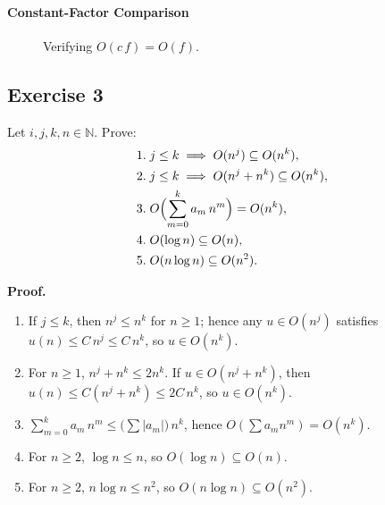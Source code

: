 \documentclass[12pt]{article}
\begin{document}
\paragraph{Constant-Factor Comparison}
\begin{figure}[h]
  \centering
  \caption{Verifying \(O(c\,f)=O(f)\).}
\end{figure}

\subsection{Exercise 3}
Let \(i,j,k,n\in\mathbb N\).  Prove:
\[
\begin{aligned}
1.\;&j\le k\implies O(n^j)\subseteq O(n^k),\\
2.\;&j\le k\implies O(n^j+n^k)\subseteq O(n^k),\\
3.\;&O\Bigl(\sum_{m=0}^k a_m\,n^m\Bigr)=O(n^k),\\
4.\;&O(\log n)\subseteq O(n),\\
5.\;&O(n\log n)\subseteq O(n^2).
\end{aligned}
\]

\textbf{Proof.}
\begin{enumerate}[label=\arabic*.]
  \item If \(j\le k\), then \(n^j\le n^k\) for \(n\ge1\); hence any \(u\in O(n^j)\) satisfies \(u(n)\le C\,n^j\le C\,n^k\), so \(u\in O(n^k)\).
  \item For \(n\ge1\), \(n^j+n^k\le2n^k\).  If \(u\in O(n^j+n^k)\), then \(u(n)\le C(n^j+n^k)\le2C\,n^k\), so \(u\in O(n^k)\).
  \item \(\sum_{m=0}^k a_m\,n^m\le\bigl(\sum|a_m|\bigr)\,n^k\), hence \(O(\sum a_mn^m)=O(n^k)\).
  \item For \(n\ge2\), \(\log n\le n\), so \(O(\log n)\subseteq O(n)\).
  \item For \(n\ge2\), \(n\log n\le n^2\), so \(O(n\log n)\subseteq O(n^2)\).
\end{enumerate}
\end{document}
